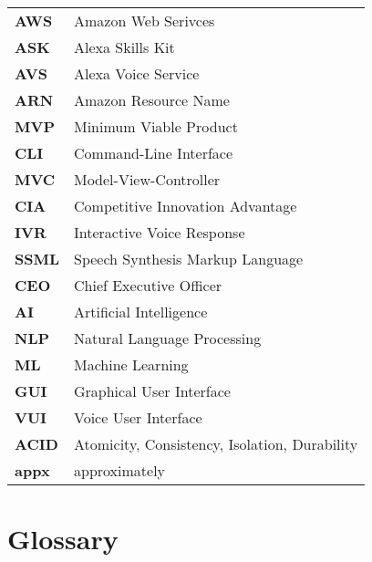 \begin{flushleft}
\begin{tabular}{ll}
\textbf{AWS}	&	Amazon Web Serivces\\
\textbf{ASK}	&	Alexa Skills Kit\\
\textbf{AVS}	&	Alexa Voice Service\\
\textbf{ARN}	&	Amazon Resource Name\\
\textbf{MVP}	&	Minimum Viable Product\\
\textbf{CLI}	&	Command-Line Interface\\
\textbf{MVC}	&	Model-View-Controller\\
\textbf{CIA}	&	Competitive Innovation Advantage\\
\textbf{IVR}	&	Interactive Voice Response\\
\textbf{SSML}	&	Speech Synthesis Markup Language\\
\textbf{CEO}	&	Chief Executive Officer\\
\textbf{AI}		&	Artificial Intelligence\\
\textbf{NLP}	&	Natural Language Processing\\
\textbf{ML}		&	Machine Learning\\
\textbf{GUI}	&	Graphical User Interface\\
\textbf{VUI}	&	Voice User Interface\\
\textbf{ACID}	&	Atomicity, Consistency, Isolation, Durability\\

\textbf{appx}	&	approximately\\
\end{tabular}
\end{flushleft}

\newpage
\section*{Glossary}
%

